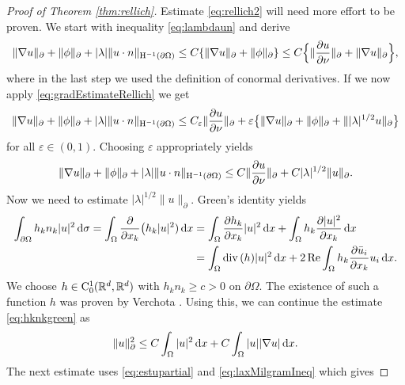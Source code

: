 \begin{proof}[Proof of Theorem \ref{thm:rellich}]
  Estimate \eqref{eq:rellich2} will need more effort to be proven.
  We start with inequality \eqref{eq:lambdaun} and derive
  \begin{align*}
    \|\nabla u\|_\partial + \|\phi\|_\partial + |\lambda| \|u \cdot n\|_{\mathrm{H}^{-1}(\partial\Omega)}
    \leq C \{ \|\nabla u\|_\partial + \| \phi\|_\partial \}
    \leq C \Big\{ \|\frac{\partial u}{\partial \nu} \|_\partial + \|\nabla u\|_\partial \Big\},
  \end{align*}
  where in the last step we used the definition of conormal derivatives.
  If we now apply \eqref{eq:gradEstimateRellich} we get
  \begin{align*}
    \|\nabla u\|_\partial + \|\phi\|_\partial + |\lambda| \|u \cdot n\|_{\mathrm{H}^{-1}(\partial\Omega)}
    \leq C_\varepsilon \| \frac{\partial u}{\partial \nu} \|_\partial + \varepsilon \big\{ \|\nabla u\|_\partial + \|\phi\|_\partial + \| |\lambda|^{1/2} u \|_\partial \big\}
  \end{align*}
  for all $\varepsilon \in (0,1)$.
  Choosing $\varepsilon$ appropriately yields
  \begin{align}
    \label{eq:partOfRellich2}
    \|\nabla u\|_\partial + \|\phi\|_\partial + |\lambda| \|u \cdot n\|_{\mathrm{H}^{-1}(\partial\Omega)}
    \leq C \|\frac{\partial u}{\partial \nu} \|_\partial + C |\lambda|^{1/2} \| u\|_\partial.
  \end{align}
  Now we need to estimate $|\lambda|^{1/2} \|u\|_\partial$.
  Green's identity yields
  \begin{align}
    \int_{\partial\Omega} h_k n_k |u|^2 \, {\operatorname{d}\!{\sigma}}
    = \int_{\Omega} \frac{\partial}{\partial x_k} \big( h_k |u|^2 ) \, {\operatorname{d}\!{x}}
    &= \int_{\Omega} \frac{\partial h_k}{\partial x_k} |u|^2 \, {\operatorname{d}\!{x}} + \int_{\Omega} h_k \frac{\partial |u|^2}{\partial x_k}  \, {\operatorname{d}\!{x}} \nonumber\\
    \label{eq:hknkgreen}
    &= \int_\Omega \mathrm{div\,} (h) |u|^2 \, {\operatorname{d}\!{x}} + 2 \operatorname{Re} \int_\Omega h_k \frac{\partial \bar u_i}{\partial x_k} u_i \, {\operatorname{d}\!{x}}.
  \end{align}
  We choose $h \in \mathrm{C}_0^1(\mathbb{R}^d, \mathbb{R}^d)$ with $h_k n_k \geq c > 0$ on $\partial\Omega$. 
  The existence of such a function $h$ was proven by Verchota \cite{verchotaDiss}.
  Using this, we can continue the estimate \eqref{eq:hknkgreen} as
  \begin{align}
    \label{eq:estupartial}
    \|u\|_\partial^2 \leq C \int_\Omega |u|^2 \, {\operatorname{d}\!{x}} + C \int_\Omega |u| |\nabla u| \, {\operatorname{d}\!{x}}.
  \end{align}
  The next estimate uses \eqref{eq:estupartial} and \eqref{eq:laxMilgramIneq} which gives

\end{proof}
